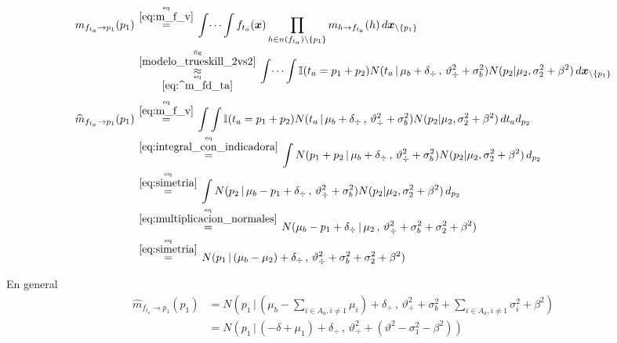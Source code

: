 \documentclass[article]{jss}
\newcommand\hfrac[2]{\genfrac{}{}{0pt}{}{#1}{#2}} %
\begin{document}
\begin{appendix}
\begin{equation}\label{eq:^m_fta_p}
\begin{split}
m_{f_{t_a} \rightarrow p_1}(p_1) & \overset{\hfrac{\text{eq}}{\ref{eq:m_f_v}}}{=} \int \dots \int f_{t_a}(\bm{x}) \prod_{h \in n(f_{t_a}) \setminus \{p_1\} } m_{h \rightarrow f_{t_a}}(h) \, d\bm{x}_{\setminus \{p_1\} }  \\
&\overset{\hfrac{\text{fig}}{\ref{modelo_trueskill_2vs2}}}{\underset{\hfrac{\text{eq}}{\ref{eq:^m_fd_ta}}}{\approx}}  \int \dots \int \mathbb{I}(t_a = p_1 + p_2) N(t_a \, | \, \mu_b + \delta_{\div} \, , \, \vartheta_{\div}^2 + \sigma_b^2) N(p_2 | \mu_2 , \sigma_2^2 + \beta^2)  \, d\bm{x}_{\setminus \{p_1\} } \\[0.1cm]
\widehat{m}_{f_{t_a} \rightarrow p_1}(p_1)  & \overset{\hfrac{\text{eq}}{\ref{eq:m_f_v}}}{=} \int \int \mathbb{I}(t_a = p_1 + p_2) N(t_a \, | \, \mu_b + \delta_{\div} \, , \, \vartheta_{\div}^2 + \sigma_b^2) N(p_2 | \mu_2 , \sigma_2^2 + \beta^2)  \, d{t_a} d_{p_2} \\
& \overset{\hfrac{\text{eq}}{\ref{eq:integral_con_indicadora}}}{=} \int N(p_1 + p_2 \, | \, \mu_b + \delta_{\div} \, , \, \vartheta_{\div}^2 + \sigma_b^2) N(p_2 | \mu_2 , \sigma_2^2+ \beta^2 )   \, d_{p_2} \\
& \overset{\hfrac{\text{eq}}{\ref{eq:simetria}}}{=}\int N(p_2 \, | \, \mu_b - p_1 + \delta_{\div} \, , \, \vartheta_{\div}^2 + \sigma_b^2) N(p_2 | \mu_2 , \sigma_2^2 + \beta^2)   \, d_{p_2} \\
& \overset{\hfrac{\text{eq}}{\ref{eq:multiplicacion_normales}}}{=} N(\mu_b - p_1 + \delta_{\div} \,|\, \mu_2 \,,\,\vartheta_{\div}^2 + \sigma_b^2 + \sigma_2^2 + \beta^2)   \\
& \overset{\hfrac{\text{eq}}{\ref{eq:simetria}}}{=}  N( p_1 \,|\,  (\mu_b - \mu_2) + \delta_{\div}  \,,\,\vartheta_{\div}^2 + \sigma_b^2 + \sigma_2^2 + \beta^2)  \\
\end{split}
\end{equation}


En general
\begin{equation}
\begin{split}
\widehat{m}_{f_{t_a} \rightarrow p_1}(p_1) &= N( p_1 \,|\, (\mu_b  - \sum_{i \in A_a, i\neq1} \mu_i) + \delta_{\div}  \,,\,\vartheta_{\div}^2 + \sigma_b^2 + \sum_{i \in A_a, i\neq1} \sigma_i^2 + \beta^2 ) \\
 & = N( p_1 \,|\, (-\delta + \mu_1) + \delta_{\div}  \,,\,\vartheta_{\div}^2 + (\vartheta^2 - \sigma_1^2 - \beta^2))
\end{split}
\end{equation}



\end{appendix}
\end{document}
